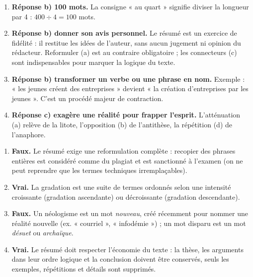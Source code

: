 \documentclass[11pt]{article}
\begin{document}
\begin{exoresolu}
\begin{enumerate}
\item \textbf{Réponse b) 100 mots.} La consigne « au quart » signifie diviser la longueur par 4 : $400 \div 4 = 100$ mots.
\item \textbf{Réponse b) donner son avis personnel.} Le résumé est un exercice de fidélité : il restitue les idées de l'auteur, sans aucun jugement ni opinion du rédacteur. Reformuler (a) est au contraire obligatoire ; les connecteurs (c) sont indispensables pour marquer la logique du texte.
\item \textbf{Réponse b) transformer un verbe ou une phrase en nom.} Exemple : « les jeunes créent des entreprises » devient « la création d'entreprises par les jeunes ». C'est un procédé majeur de contraction.
\item \textbf{Réponse c) exagère une réalité pour frapper l'esprit.} L'atténuation (a) relève de la litote, l'opposition (b) de l'antithèse, la répétition (d) de l'anaphore.
\end{enumerate}
\end{exoresolu}

\begin{exoresolu}
\begin{enumerate}
\item \textbf{Faux.} Le résumé exige une reformulation complète : recopier des phrases entières est considéré comme du plagiat et est sanctionné à l'examen (on ne peut reprendre que les termes techniques irremplaçables).
\item \textbf{Vrai.} La gradation est une suite de termes ordonnés selon une intensité croissante (gradation ascendante) ou décroissante (gradation descendante).
\item \textbf{Faux.} Un néologisme est un mot \emph{nouveau}, créé récemment pour nommer une réalité nouvelle (ex. « courriel », « infodémie ») ; un mot disparu est un mot \emph{désuet} ou \emph{archaïque}.
\item \textbf{Vrai.} Le résumé doit respecter l'économie du texte : la thèse, les arguments dans leur ordre logique et la conclusion doivent être conservés, seuls les exemples, répétitions et détails sont supprimés.
\end{enumerate}
\end{exoresolu}
\end{document}
